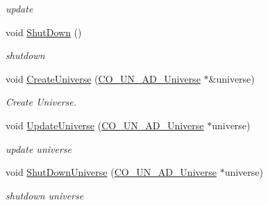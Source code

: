 \begin{DoxyCompactItemize}
\begin{DoxyCompactList}\small\item\em update \item\end{DoxyCompactList}\item 
\hypertarget{classContent_1_1Content_a5a199ecb75aff618599bc31791448525}{
void \hyperlink{classContent_1_1Content_a5a199ecb75aff618599bc31791448525}{ShutDown} ()}
\label{classContent_1_1Content_a5a199ecb75aff618599bc31791448525}

\begin{DoxyCompactList}\small\item\em shutdown \item\end{DoxyCompactList}\item 
\hypertarget{classContent_1_1Content_a6f517958dc86000164f8f3f344f24f37}{
void \hyperlink{classContent_1_1Content_a6f517958dc86000164f8f3f344f24f37}{CreateUniverse} (\hyperlink{classContent_1_1Universe_1_1Admin_1_1Universe}{CO\_\-UN\_\-AD\_\-Universe} $\ast$\&universe)}
\label{classContent_1_1Content_a6f517958dc86000164f8f3f344f24f37}

\begin{DoxyCompactList}\small\item\em Create Universe. \item\end{DoxyCompactList}\item 
\hypertarget{classContent_1_1Content_a71c7426fe18bcf03f2eed96ef3f4cf82}{
void \hyperlink{classContent_1_1Content_a71c7426fe18bcf03f2eed96ef3f4cf82}{UpdateUniverse} (\hyperlink{classContent_1_1Universe_1_1Admin_1_1Universe}{CO\_\-UN\_\-AD\_\-Universe} $\ast$universe)}
\label{classContent_1_1Content_a71c7426fe18bcf03f2eed96ef3f4cf82}

\begin{DoxyCompactList}\small\item\em update universe \item\end{DoxyCompactList}\item 
\hypertarget{classContent_1_1Content_a08c195b3660cb9a9c9a117ef9df29907}{
void \hyperlink{classContent_1_1Content_a08c195b3660cb9a9c9a117ef9df29907}{ShutDownUniverse} (\hyperlink{classContent_1_1Universe_1_1Admin_1_1Universe}{CO\_\-UN\_\-AD\_\-Universe} $\ast$universe)}
\label{classContent_1_1Content_a08c195b3660cb9a9c9a117ef9df29907}

\begin{DoxyCompactList}\small\item\em shutdown universe \item\end{DoxyCompactList}\end{DoxyCompactItemize}
